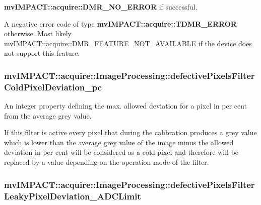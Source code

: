 \begin{DoxyItemize}
\item {\bfseries mv\+I\+M\+P\+A\+C\+T\+::acquire\+::\+D\+M\+R\+\_\+\+N\+O\+\_\+\+E\+R\+R\+O\+R} if successful.
\item A negative error code of type {\bfseries mv\+I\+M\+P\+A\+C\+T\+::acquire\+::\+T\+D\+M\+R\+\_\+\+E\+R\+R\+O\+R} otherwise. Most likely mv\+I\+M\+P\+A\+C\+T\+::acquire\+::\+D\+M\+R\+\_\+\+F\+E\+A\+T\+U\+R\+E\+\_\+\+N\+O\+T\+\_\+\+A\+V\+A\+I\+L\+A\+B\+L\+E if the device does not support this feature. 
\end{DoxyItemize}\hypertarget{classmv_i_m_p_a_c_t_1_1acquire_1_1_image_processing_ae49f3046e9f407c2e3ef7c7e85d204cb}{
\subsubsection[{defective\+Pixels\+Filter\+Cold\+Pixel\+Deviation\+\_\+pc}]{ mv\+I\+M\+P\+A\+C\+T\+::acquire\+::\+Image\+Processing\+::defective\+Pixels\+Filter\+Cold\+Pixel\+Deviation\+\_\+pc}}\label{classmv_i_m_p_a_c_t_1_1acquire_1_1_image_processing_ae49f3046e9f407c2e3ef7c7e85d204cb}


An integer property defining the max. allowed deviation for a pixel in per cent from the average grey value. 

If this filter is active every pixel that during the calibration produces a grey value which is lower than the average grey value of the image minus the allowed deviation in per cent will be considered as a cold pixel and therefore will be replaced by a value depending on the operation mode of the filter. \hypertarget{classmv_i_m_p_a_c_t_1_1acquire_1_1_image_processing_a57e5c8cf92c06a12d27036387978b36d}{
\subsubsection[{defective\+Pixels\+Filter\+Leaky\+Pixel\+Deviation\+\_\+\+A\+D\+C\+Limit}]{ mv\+I\+M\+P\+A\+C\+T\+::acquire\+::\+Image\+Processing\+::defective\+Pixels\+Filter\+Leaky\+Pixel\+Deviation\+\_\+\+A\+D\+C\+Limit}}\label{classmv_i_m_p_a_c_t_1_1acquire_1_1_image_processing_a57e5c8cf92c06a12d27036387978b36d}


